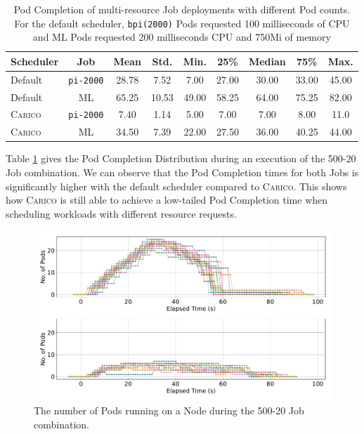 \begin{table}[ht!]
\centering
    \begin{tabular}{|l|c|c|c|c|c|c|c|c|}
    \hline
        \bfseries Scheduler & \bfseries Job & \bfseries Mean & \bfseries Std. &
        \bfseries Min. & \bfseries 25\% & \bfseries Median & \bfseries 75\% & \bfseries Max. \\
    \hline
        Default & \texttt{pi-2000} & 28.78 & 7.52 & 7.00 & 27.00 & 30.00 & 33.00 & 45.00 \\
        Default & ML & 65.25 & 10.53 & 49.00 & 58.25 & 64.00 & 75.25 & 82.00 \\
        \textsc{Carico} & \texttt{pi-2000} & 7.40 & 1.14 & 5.00 & 7.00 & 7.00 & 8.00 & 11.0 \\
        \textsc{Carico} & ML & 34.50 & 7.39 & 22.00 & 27.50 & 36.00 & 40.25 & 44.00 \\
    \hline
    \end{tabular}
    \caption{Pod Completion of multi-resource Job deployments with different Pod
    counts. For the default scheduler, \texttt{bpi(2000)} Pods requested 100
    milliseconds of CPU and ML Pods requested 200 milliseconds CPU and 750Mi of
    memory}
    \label{tab:mixed-pod-completions}
\end{table}

Table \ref{tab:mixed-pod-completions} gives the Pod Completion Distribution
during an execution of the 500-20 Job combination. We can observe that the
Pod Completion times for both Jobs is significantly higher with the default
scheduler compared to \textsc{Carico}. This shows how \textsc{Carico} is still able to achieve a
low-tailed Pod Completion time when scheduling workloads with different resource
requests.


\begin{figure}[ht!]
    \centering
    \includegraphics[width=\textwidth]{images/mixed-running-pods.pdf}
    \caption{The number of Pods running on a Node during the
    500-20 Job combination.}
    \label{fig:mixed-pod-running}
\end{figure}


